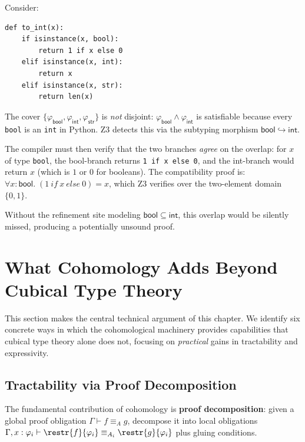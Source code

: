 \begin{example}
\label{ex:bool-subtype}
Consider:
\begin{lstlisting}
def to_int(x):
    if isinstance(x, bool):
        return 1 if x else 0
    elif isinstance(x, int):
        return x
    elif isinstance(x, str):
        return len(x)
\end{lstlisting}
The cover $\{\varphi_\mathsf{bool}, \varphi_\mathsf{int},
\varphi_\mathsf{str}\}$ is \emph{not} disjoint:
$\varphi_\mathsf{bool} \wedge \varphi_\mathsf{int}$ is satisfiable
because every \texttt{bool} is an \texttt{int} in Python.
Z3 detects this via the subtyping morphism
$\mathsf{bool} \hookrightarrow \mathsf{int}$.

The compiler must then verify that the two branches \emph{agree} on
the overlap: for $x$ of type \texttt{bool}, the bool-branch returns
\texttt{1 if x else 0}, and the int-branch would return $x$ (which
is $1$ or $0$ for booleans).  The compatibility proof is:
$\forall x : \mathsf{bool}.\; (1\ \mathit{if}\ x\ \mathit{else}\ 0) = x$,
which Z3 verifies over the two-element domain $\{0, 1\}$.

Without the refinement site modeling $\mathsf{bool} \subseteq
\mathsf{int}$, this overlap would be silently missed, producing a
potentially unsound proof.
\end{example}


\section{What Cohomology Adds Beyond Cubical Type Theory}
\label{sec:what-cohomology-adds}

This section makes the central technical argument of this chapter.
We identify six concrete ways in which the cohomological machinery
provides capabilities that cubical type theory alone does not,
focusing on \emph{practical} gains in tractability and expressivity.


\subsection{Tractability via Proof Decomposition}
\label{sec:decomposition}

The fundamental contribution of cohomology is
\textbf{proof decomposition}: given a global proof obligation
$\Gamma \vdash f \equiv_A g$, decompose it into local obligations
$\Gamma, x : \varphi_i \vdash \restr{f}{\varphi_i} \equiv_{A_i}
\restr{g}{\varphi_i}$ plus gluing conditions.

